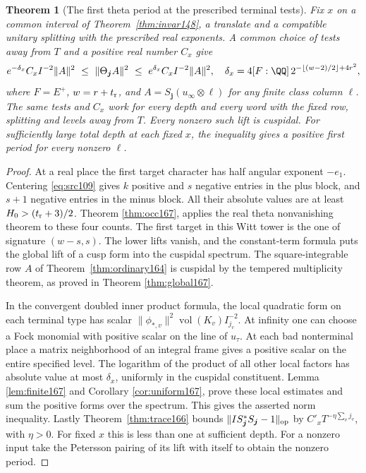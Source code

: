 \documentclass[a4paper,11pt]{article}
\newtheorem{theorem}[proposition]{Theorem}
\theoremstyle{definition}
\theoremstyle{remark}
\numberwithin{equation}{section}
\begin{document}
\begin{theorem}[The first theta period at the prescribed terminal tests]
\leavevmode\label{thm:first168}
Fix \(x\) on a common interval of Theorem~\ref{thm:invar148},
a translate and a compatible unitary splitting with the
prescribed real exponents. A common choice of tests away
from \(T\) and a positive real number \(C_x\) give
\[
 e^{-\delta_x} C_x I^{-2}\|A\|^2
 \ \le\ \|\Theta_{\boldsymbol j} A\|^2
 \ \le\ e^{\delta_x} C_x I^{-2}\|A\|^2,\quad
 \delta_x=4[F:\QQ]\,2^{-\lfloor(w-2)/2\rfloor+4r^2},
\]
where \(F=E^+\), \(w=r+t_{\rm r}\), and
\(A=S_{\boldsymbol j}(u_\infty\otimes\ell)\) for any finite
class column \(\ell\). The same tests and \(C_x\) work for
every depth and every word with the fixed row, splitting and
levels away from \(T\). Every nonzero such lift is cuspidal.
For sufficiently large total depth at each fixed \(x\),
the inequality gives a positive first period for every
nonzero \(\ell\).
\end{theorem}
\begin{proof}
At a real place the first target character has half angular
exponent \(-e_1\). Centering \eqref{eq:src109} gives \(k\)
positive and \(s\) negative entries in the plus block, and
\(s+1\) negative entries in the minus block. All their
absolute values are at least \(H_0>(t_{\rm r}+3)/2\).
Theorem \ref{thm:occ167}, applies the real theta
nonvanishing theorem to these four counts. The first target
in this Witt tower is the one of signature \((w-s,s)\).
The lower lifts vanish, and the constant-term formula puts
the global lift of a cusp form into the cuspidal spectrum.
The square-integrable row \(A\) of Theorem~\ref{thm:ordinary164}
is cuspidal by the tempered multiplicity theorem, as proved
in Theorem \ref{thm:global167}.

In the convergent doubled inner product formula, the local
quadratic form on each terminal type has scalar
\(\|\phi_{*,v}\|^2\operatorname{vol}(K_v) I_{j_v}^{-2}\).
At infinity one can choose a Fock monomial with positive
scalar on the line of \(u_\tau\). At each bad nonterminal
place a matrix neighborhood of an integral frame gives a
positive scalar on the entire specified level. The logarithm
of the product of all other local factors has absolute value
at most \(\delta_x\), uniformly in the cuspidal constituent.
Lemma \ref{lem:finite167} and Corollary \ref{cor:uniform167}, prove these local
estimates and sum the positive forms over the spectrum.
This gives the asserted norm inequality. Lastly
Theorem~\ref{thm:trace166} bounds
\(\|I S_{\boldsymbol j}^*S_{\boldsymbol j}-1\|_{\rm op}\)
by \(C'_xT^{-\eta\sum_v j_v}\), with \(\eta>0\).
For fixed \(x\) this is less than one at sufficient depth.
For a nonzero input take the Petersson pairing of its lift
with itself to obtain the nonzero period.
\end{proof}
\end{document}
